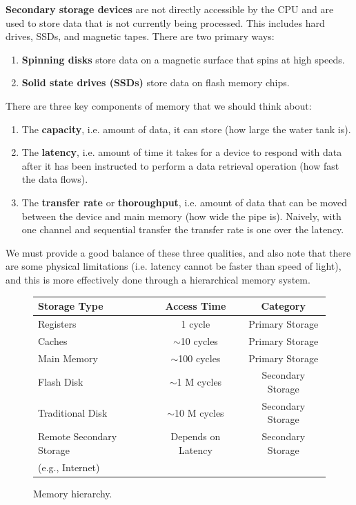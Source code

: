   \begin{definition}
    \textbf{Secondary storage devices} are not directly accessible by the CPU and are used to store data that is not currently being processed. This includes hard drives, SSDs, and magnetic tapes. There are two primary ways: 
    \begin{enumerate}
      \item \textbf{Spinning disks} store data on a magnetic surface that spins at high speeds.
      \item \textbf{Solid state drives (SSDs)} store data on flash memory chips.
    \end{enumerate}
  \end{definition}

  There are three key components of memory that we should think about: 
  \begin{enumerate}
    \item The \textbf{capacity}, i.e. amount of data, it can store (how large the water tank is). 
    \item The \textbf{latency}, i.e. amount of time it takes for a device to respond with data after it has been instructed to perform a data retrieval operation (how fast the data flows). 
    \item The \textbf{transfer rate} or \textbf{thoroughput}, i.e. amount of data that can be moved between the device and main memory (how wide the pipe is). Naively, with one channel and sequential transfer the transfer rate is one over the latency. 
  \end{enumerate}

  We must provide a good balance of these three qualities, and also note that there are some physical limitations (i.e. latency cannot be faster than speed of light), and this is more effectively done through a hierarchical memory system.

  \begin{figure}[H]
    \centering 
    \begin{tabular}{|l|c|c|}
      \hline
      \textbf{Storage Type} & \textbf{Access Time} & \textbf{Category} \\
      \hline
      Registers & 1 cycle & Primary Storage \\
      \hline
      Caches & $\sim$10 cycles & Primary Storage \\
      \hline
      Main Memory & $\sim$100 cycles & Primary Storage \\
      \hline
      Flash Disk & $\sim$1 M cycles & Secondary Storage \\
      \hline
      Traditional Disk & $\sim$10 M cycles & Secondary Storage \\
      \hline
      Remote Secondary Storage & Depends on Latency & Secondary Storage \\
      (e.g., Internet) & & \\
      \hline
    \end{tabular}
    \caption{Memory hierarchy.} 
    \label{fig:memory_hierarchy}
  \end{figure}

